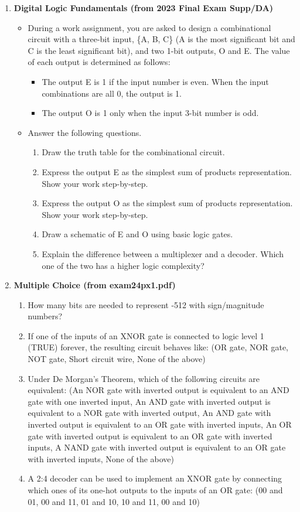 \documentclass[11pt]{article}
\begin{document}
\begin{enumerate}[label=\textbf{C\arabic*.}]
  \item \textbf{Digital Logic Fundamentals (from 2023 Final Exam Supp/DA)}
  \begin{itemize}
    \item During a work assignment, you are asked to design a combinational circuit with a three-bit input, \{A, B, C\} (A is the most significant bit and C is the least significant bit), and two 1-bit outputs, O and E. The value of each output is determined as follows:
    \begin{itemize}
        \item The output E is 1 if the input number is even. When the input combinations are all 0, the output is 1.
        \item The output O is 1 only when the input 3-bit number is odd.
    \end{itemize}
    \item Answer the following questions.
    \begin{enumerate}
        \item[A.] Draw the truth table for the combinational circuit.
        \item[B.] Express the output E as the simplest sum of products representation. Show your work step-by-step.
        \item[C.] Express the output O as the simplest sum of products representation. Show your work step-by-step.
        \item[D.] Draw a schematic of E and O using basic logic gates.
        \item[E.] Explain the difference between a multiplexer and a decoder. Which one of the two has a higher logic complexity?
    \end{enumerate}
  \end{itemize}

  \item \textbf{Multiple Choice (from exam24px1.pdf)}
    \begin{enumerate}
        \item How many bits are needed to represent -512 with sign/magnitude numbers?
        \item If one of the inputs of an XNOR gate is connected to logic level 1 (TRUE) forever, the resulting circuit behaves like: (OR gate, NOR gate, NOT gate, Short circuit wire, None of the above)
        \item Under De Morgan's Theorem, which of the following circuits are equivalent: (An NOR gate with inverted output is equivalent to an AND gate with one inverted input, An AND gate with inverted output is equivalent to a NOR gate with inverted output, An AND gate with inverted output is equivalent to an OR gate with inverted inputs, An OR gate with inverted output is equivalent to an OR gate with inverted inputs, A NAND gate with inverted output is equivalent to an OR gate with inverted inputs, None of the above)
        \item A 2:4 decoder can be used to implement an XNOR gate by connecting which ones of its one-hot outputs to the inputs of an OR gate: (00 and 01, 00 and 11, 01 and 10, 10 and 11, 00 and 10)
    \end{enumerate}

\end{enumerate}
\end{document}
